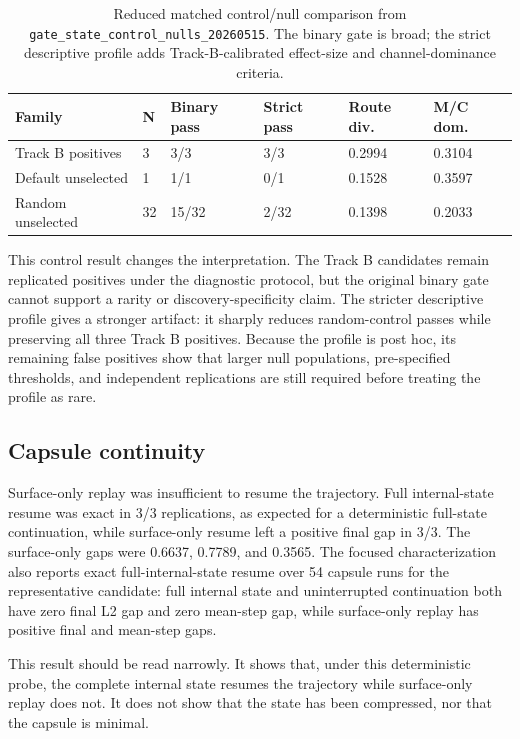 \documentclass[11pt]{article}
\begin{document}
\begin{table}[t]
\centering
\caption{Reduced matched control/null comparison from
\texttt{gate\_state\_control\_nulls\_20260515}. The binary gate is broad; the
strict descriptive profile adds Track-B-calibrated effect-size and channel-dominance
criteria.}
\label{tab:controls}
\begin{tabular}{llllll}
\toprule
Family & N & Binary pass & Strict pass & Route div. & M/C dom. \\
\midrule
Track B positives & 3 & 3/3 & 3/3 & 0.2994 & 0.3104 \\
Default unselected & 1 & 1/1 & 0/1 & 0.1528 & 0.3597 \\
Random unselected & 32 & 15/32 & 2/32 & 0.1398 & 0.2033 \\
\bottomrule
\end{tabular}
\end{table}

This control result changes the interpretation. The Track B candidates remain
replicated positives under the diagnostic protocol, but the original binary
gate cannot support a rarity or discovery-specificity claim. The stricter
descriptive profile gives a stronger artifact: it sharply reduces
random-control passes while preserving all three Track B positives. Because the
profile is post hoc, its remaining false positives show that larger null
populations, pre-specified thresholds, and independent replications are still
required before treating the profile as rare.

\subsection{Capsule continuity}

Surface-only replay was insufficient to resume the trajectory. Full
internal-state resume was exact in 3/3 replications, as expected for a
deterministic full-state continuation, while surface-only resume left a
positive final gap in 3/3. The surface-only gaps were 0.6637, 0.7789, and
0.3565. The focused characterization also reports exact full-internal-state
resume over 54 capsule runs for the representative candidate: full internal
state and uninterrupted continuation both have zero final L2 gap and zero
mean-step gap, while surface-only replay has positive final and mean-step
gaps.

This result should be read narrowly. It shows that, under this deterministic
probe, the complete internal state resumes the trajectory while surface-only
replay does not. It does not show that the state has been compressed, nor that
the capsule is minimal.
\end{document}
